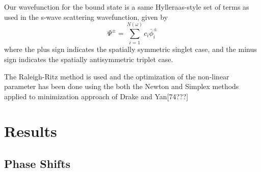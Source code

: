 \documentclass[preprint,showpacs,preprintnumbers,amsmath,amssymb]{revtex4}
\begin{document}
Our wavefunction for the bound state is a same  Hylleraas-style set of terms as used in the s-wave scattering wavefunction, given by
\begin{equation}
\label{eq:BoundWavefn}
\Psi^\pm = \sum_{i=1}^{N(\omega)} c_i \bar{\phi}_i^\pm
\end{equation}
\noindent where the plus sign indicates the spatially symmetric singlet case, and the minus sign indicates the spatially antisymmetric triplet case.

The Raleigh-Ritz method is used and the optimization of the non-linear parameter has been done using the both the Newton and Simplex methods applied to minimization approach of Drake and Yan[74???]




\section{Results}
\subsection{Phase Shifts}
\end{document}
